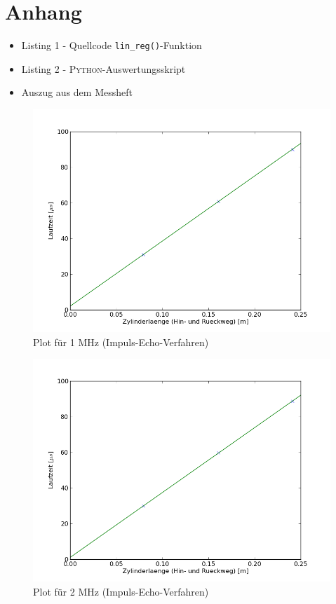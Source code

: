 \documentclass[11pt,ngerman,a4paper]{article}
\begin{document}
\section{Anhang}
\begin{itemize}
\item Listing 1 - Quellcode \texttt{lin\_reg()}-Funktion
\item Listing 2 - \textsc{Python}-Auswertungsskript

\item Auszug aus dem Messheft
\end{itemize}
\newpage
\begin{figure}[h]
\includegraphics[width=12cm]{Fig1.png}
\caption{Plot für 1 MHz (Impuls-Echo-Verfahren)}
\label{fig1}
\end{figure}
\newpage
\begin{figure}[h]
\includegraphics[width=12cm]{Fig2.png}
\caption{Plot für 2 MHz (Impuls-Echo-Verfahren)}
\label{fig2}
\end{figure}
\end{document}
